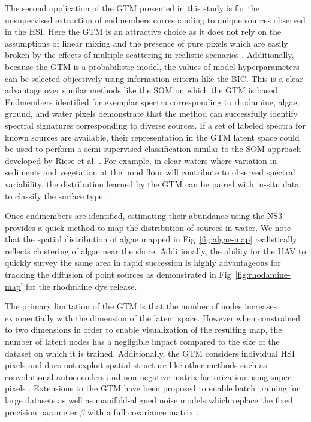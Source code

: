 \documentclass[remotesensing,article,submit,pdftex,moreauthors]{Definitions/mdpi}
\begin{document}
The second application of the GTM presented in this study is for the unsupervised extraction of endmembers corresponding to unique sources observed in the HSI. Here the GTM is an attractive choice as it does not rely on the assumptions of linear mixing and the presence of pure pixels which are easily broken by the effects of multiple scattering in realistic scenarios \cite{nonlinearity-in-hsi}. Additionally, because the GTM is a probabilistic model, the values of model hyperparameters can be selected objectively using information criteria like the BIC. This is a clear advantage over similar methods like the SOM on which the GTM is based. Endmembers identified for exemplar spectra corresponding to rhodamine, algae, ground, and water pixels demonstrate that the method can successfully identify spectral signatures corresponding to diverse sources. If a set of labeled spectra for known sources are available, their representation in the GTM latent space could be used to perform a semi-supervised classification similar to the SOM approach developed by Riese et al. \cite{riese2019supervised}. For example, in clear waters where variation in sediments and vegetation at the pond floor will contribute to observed spectral variability, the distribution learned by the GTM can be paired with in-situ data to classify the surface type.

Once endmembers are identified, estimating their abundance using the NS3 provides a quick method to map the distribution of sources in water. We note that the spatial distribution of algae mapped in Fig~\ref{fig:algae-map} realistically reflects clustering of algae near the shore. Additionally, the ability for the UAV to quickly survey the same area in rapid succession is highly advantageous for tracking the diffusion of point sources as demonstrated in Fig~\ref{fig:rhodamine-map} for the rhodmaine dye release.

The primary limitation of the GTM is that the number of nodes increases exponentially with the dimension of the latent space. However when constrained to two dimensions in order to enable visualization of the resulting map, the number of latent nodes has a negligible impact compared to the size of the dataset on which it is trained. Additionally, the GTM considers individual HSI pixels and does not exploit spatial structure like other methods such as convolutional autoencoders and non-negative matrix factorization using super-pixels \cite{palsson2020convolutional,Feng2022HyperspectralUB}. Extensions to the GTM have been proposed to enable batch training for large datasets as well as manifold-aligned noise models which replace the fixed precision parameter $\beta$ with a full covariance matrix \cite{gtm-bishop-2}. 
\end{document}
